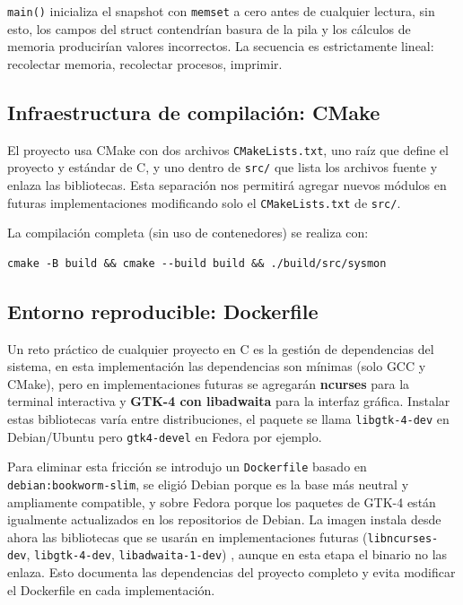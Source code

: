 \documentclass[12pt,letterpaper]{article}
\begin{document}
\texttt{main()} inicializa el snapshot con \texttt{memset} a cero antes de cualquier lectura, sin esto, los
campos del struct contendrían basura de la pila y los cálculos de memoria producirían valores incorrectos.
La secuencia es estrictamente lineal: recolectar memoria, recolectar procesos, imprimir.

\subsection*{Infraestructura de compilación: CMake}

El proyecto usa CMake con dos archivos \texttt{CMakeLists.txt}, uno raíz que define el proyecto y estándar de C,
y uno dentro de \texttt{src/} que lista los archivos fuente y enlaza las bibliotecas. Esta separación nos
permitirá agregar nuevos módulos en futuras implementaciones modificando solo el \texttt{CMakeLists.txt} de \texttt{src/}.

\medskip

La compilación completa (sin uso de contenedores) se realiza con:

\begin{Verbatim}[frame=single, rulecolor=\color{black!20}, fontsize=\small]
cmake -B build && cmake --build build && ./build/src/sysmon
\end{Verbatim}

\subsection*{Entorno reproducible: Dockerfile}

Un reto práctico de cualquier proyecto en C es la gestión de dependencias del sistema, en esta implementación
las dependencias son mínimas (solo GCC y CMake), pero en implementaciones futuras se agregarán \textbf{ncurses}
para la terminal interactiva y \textbf{GTK-4 con libadwaita} para la interfaz gráfica. Instalar estas bibliotecas
varía entre distribuciones, el paquete se llama \texttt{libgtk-4-dev} en Debian/Ubuntu pero \texttt{gtk4-devel}
en Fedora por ejemplo.

\medskip

Para eliminar esta fricción se introdujo un \texttt{Dockerfile} basado en \texttt{debian:bookworm-slim}, se
eligió Debian porque es la base más neutral y ampliamente compatible, y sobre Fedora porque los paquetes de GTK-4
están igualmente actualizados en los repositorios de Debian. La imagen instala desde ahora las bibliotecas que
se usarán en implementaciones futuras (\texttt{libncurses-dev}, \texttt{libgtk-4-dev}, \texttt{libadwaita-1-dev})
, aunque en esta etapa el binario no las enlaza. Esto documenta las dependencias del proyecto completo y evita
modificar el Dockerfile en cada implementación.
\end{document}
